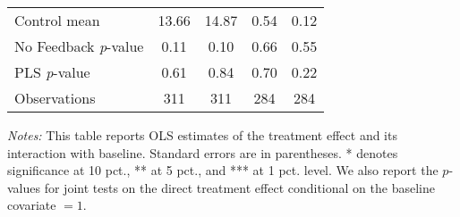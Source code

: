 \begin{table}[ht]
{\begin{threeparttable}
\begin{tabular}{l*{4}{c}}
Control mean    &    13.66         &    14.87         &     0.54         &     0.12         \\
No Feedback \emph{p}-value&     0.11         &     0.10         &     0.66         &     0.55         \\
PLS \emph{p}-value&     0.61         &     0.84         &     0.70         &     0.22         \\
Observations    &      311         &      311         &      284         &      284         \\
\bottomrule \end{tabular} \begin{tablenotes}[flushleft] \footnotesize \item \emph{Notes:} This table reports OLS estimates of the treatment effect and its interaction with baseline. Standard errors are in parentheses. * denotes significance at 10 pct., ** at 5 pct., and *** at 1 pct. level. We also report the \(p\)-values for joint tests on the direct treatment effect conditional on the baseline covariate $= 1$. \end{tablenotes} \end{threeparttable} } \end{table}

